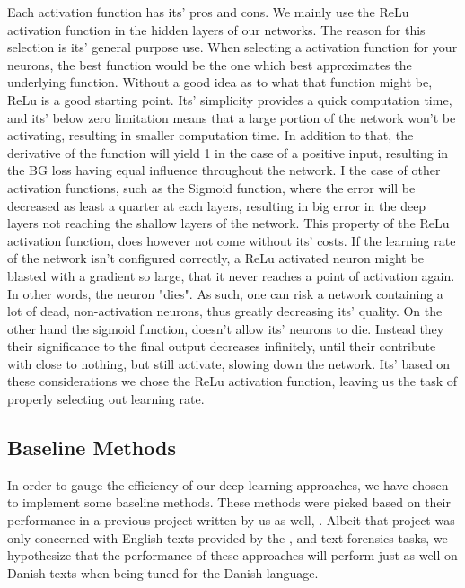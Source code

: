 Each activation function has its' pros and cons. We mainly use the \gls{ReLu}
activation function in the hidden layers of our networks. The reason for this
selection is its' general purpose use. When selecting a activation function
for your neurons, the best function would be the one which best approximates
the underlying function. Without a good idea as to what that function might
be, \gls{ReLu} is a good starting point. Its' simplicity provides a quick
computation time, and its' below zero limitation means that a large portion
of the network won't be activating, resulting in smaller computation time. In
addition to that, the derivative of the function will yield 1 in the case of a
positive input, resulting in the \gls{BG} loss having equal influence throughout
the network. I the case of other activation functions, such as the Sigmoid
function, where the error will be decreased as least a quarter at each layers,
resulting in big error in the deep layers not reaching the shallow layers of the
network. This property of the \gls{ReLu} activation function, does however not
come without its' costs. If the learning rate of the network isn't configured
correctly, a \gls{ReLu} activated neuron might be blasted with a gradient so
large, that it never reaches a point of activation again. In other words,
the neuron "dies". As such, one can risk a network containing a lot of dead,
non-activation neurons, thus greatly decreasing its' quality. On the other hand
the sigmoid function, doesn't allow its' neurons to die. Instead they their
significance to the final output decreases infinitely, until their contribute
with close to nothing, but still activate, slowing down the network. Its' based
on these considerations we chose the \gls{ReLu} activation function, leaving us
the task of properly selecting out learning rate.



\subsection{Baseline Methods}

In order to gauge the efficiency of our deep learning approaches, we have
chosen to implement some baseline methods. These methods were picked
based on their performance in a previous project written by us as well,
\cite{US}. Albeit that project was only concerned with English texts
provided by the \cite{pan:2015}, and \cite{pan:2014} text forensics tasks,
we hypothesize that the performance of these approaches will perform just
as well on Danish texts when being tuned for the Danish language.


